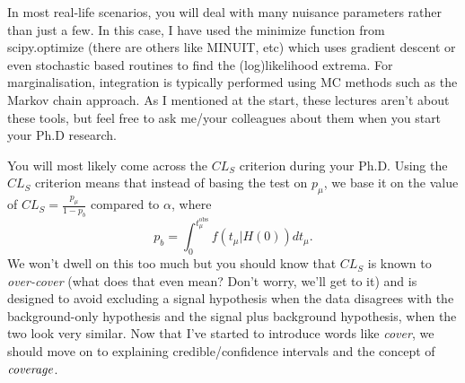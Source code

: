 In most real-life scenarios, you will deal with many nuisance parameters rather than just a few. In this case, I have used the \textsf{minimize} function from \textsf{scipy.optimize} (there are others like \textsf{MINUIT}, etc) which uses   gradient descent or even stochastic based routines to find the (log)likelihood extrema. For marginalisation, integration is typically performed using MC methods such as the Markov chain approach. As I mentioned at the start, these lectures aren't about these tools, but feel free to ask me/your colleagues about them when you start your Ph.D research. 

You will most likely come across the $CL_{S}$ criterion during your Ph.D. Using  the $CL_{S}$ criterion  means that instead of basing the test on $p_{\mu}$, we base it on the value of $CL_{S}=\frac{p_{\mu}}{1-p_{b}}$ compared to $\alpha$, where 
\begin{equation}
    p_{b} = \int_0^{t^{\mathrm{obs}}_{\mu}}  f(t_{\mu}|H(0))dt_{\mu}.
\end{equation}
We won't dwell on this too much but you should know that $CL_{S}$ is known to \emph{over-cover} (what does that even mean? Don't worry, we'll get to it) and is designed to avoid excluding a signal hypothesis when the data disagrees with the background-only hypothesis and the signal plus background hypothesis, when the two look very similar. Now that I've started to introduce words like \emph{cover}, we should move on to explaining credible/confidence intervals and the concept of $\emph{coverage}$. 